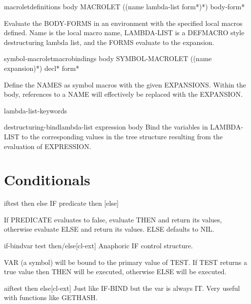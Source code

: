\documentclass[10pt,english]{book}
\begin{document}
\begin{specialop}{macrolet}{definitions \rest body}
  MACROLET ({(name lambda-list form*)}*) body-form*

Evaluate the BODY-FORMS in an environment with the specified local macros
defined. Name is the local macro name, LAMBDA-LIST is a DEFMACRO style
destructuring lambda list, and the FORMS evaluate to the expansion.
\end{specialop}

\begin{specialop}{symbol-macrolet}{macrobindings \body body}
  SYMBOL-MACROLET ({(name expansion)}*) decl* form*

Define the NAMES as symbol macros with the given EXPANSIONS. Within the
body, references to a NAME will effectively be replaced with the EXPANSION.
\end{specialop}

\begin{constant}{lambda-list-keywords}{}
  
\end{constant}

\begin{macro}{destructuring-bind}{lambda-list expression \body body}
  Bind the variables in LAMBDA-LIST to the corresponding values in the
tree structure resulting from the evaluation of EXPRESSION.
\end{macro}

\section{Conditionals}
\label{sec:conditionals}

\begin{specialop}{if}{test then \op else}
  IF predicate then [else]

If PREDICATE evaluates to false, evaluate THEN and return its values,
otherwise evaluate ELSE and return its values. ELSE defaults to NIL.
\end{specialop}

\begin{macro}{if-bind}{var test \body then/else}[cl-ext]
  Anaphoric IF control structure.

VAR (a symbol) will be bound to the primary value of TEST. If
TEST returns a true value then THEN will be executed, otherwise
ELSE will be executed.
\end{macro}

\begin{macro}{aif}{test then \op else}[cl-ext]
  Just like IF-BIND but the var is always IT. Very useful with
  functions like GETHASH.
\end{macro}
\end{document}
